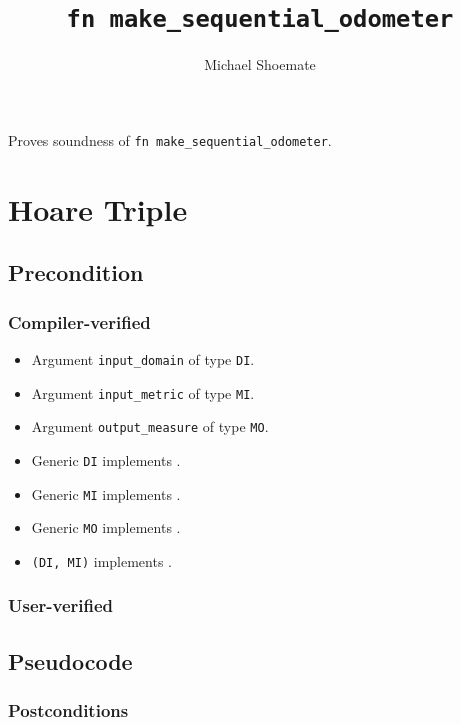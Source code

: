 \documentclass{article}
\title{\texttt{fn make\_sequential\_odometer}}
\author{Michael Shoemate}
\date{}
\begin{document}
\maketitle

\contrib
Proves soundness of \texttt{fn make\_sequential\_odometer}.

\section{Hoare Triple}
\subsection*{Precondition}
\subsubsection*{Compiler-verified}
\begin{itemize}
    \item Argument \texttt{input\_domain} of type \texttt{DI}.
    \item Argument \texttt{input\_metric} of type \texttt{MI}.
    \item Argument \texttt{output\_measure} of type \texttt{MO}.
    \item Generic \texttt{DI} implements .
    \item Generic \texttt{MI} implements .
    \item Generic \texttt{MO} implements .
    \item \texttt{(DI, MI)} implements .
\end{itemize}
\subsubsection*{User-verified}


\subsection*{Pseudocode}


\subsubsection*{Postconditions}
\end{document}
